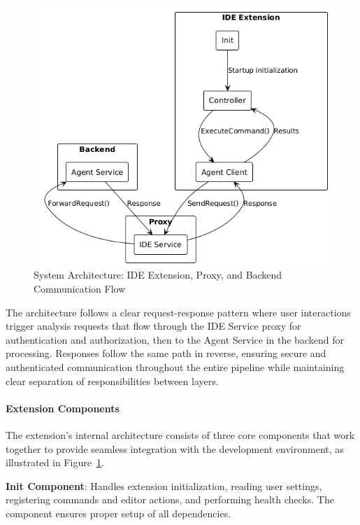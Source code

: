 \begin{spacing}{1.2}
\begin{figure}[H]
    \centering
    \includegraphics[scale=0.6]{Images/extension_integration.png}
    \caption{System Architecture: IDE Extension, Proxy, and Backend Communication Flow}
    \label{fig:high_level_frontend_architecture}
\end{figure}

The architecture follows a clear request-response pattern where user interactions trigger analysis requests that flow through the IDE Service proxy for authentication and authorization, then to the Agent Service in the backend for processing. Responses follow the same path in reverse, ensuring secure and authenticated communication throughout the entire pipeline while maintaining clear separation of responsibilities between layers.

\paragraph{Extension Components}
The extension's internal architecture consists of three core components that work together to provide seamless integration with the development environment, as illustrated in Figure~\ref{fig:high_level_frontend_architecture}.

\textbf{Init Component}: Handles extension initialization, reading user settings, registering commands and editor actions, and performing health checks. The component ensures proper setup of all dependencies.


\end{spacing}
